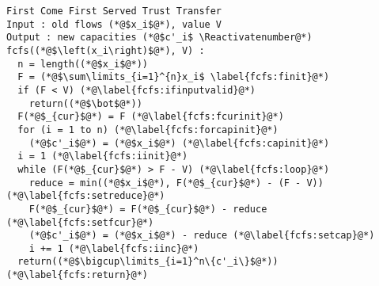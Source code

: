 \Suppressnumber
\begin{lstlisting}[label=fcfs, style=numbers]
First Come First Served Trust Transfer
Input : old flows (*@$x_i$@*), value V
Output : new capacities (*@$c'_i$ \Reactivatenumber@*)
fcfs((*@$\left(x_i\right)$@*), V) :
  n = length((*@$x_i$@*))
  F = (*@$\sum\limits_{i=1}^{n}x_i$ \label{fcfs:finit}@*)
  if (F < V) (*@\label{fcfs:ifinputvalid}@*)
    return((*@$\bot$@*))
  F(*@$_{cur}$@*) = F (*@\label{fcfs:fcurinit}@*)
  for (i = 1 to n) (*@\label{fcfs:forcapinit}@*)
    (*@$c'_i$@*) = (*@$x_i$@*) (*@\label{fcfs:capinit}@*)
  i = 1 (*@\label{fcfs:iinit}@*)
  while (F(*@$_{cur}$@*) > F - V) (*@\label{fcfs:loop}@*)
    reduce = min((*@$x_i$@*), F(*@$_{cur}$@*) - (F - V)) (*@\label{fcfs:setreduce}@*)
    F(*@$_{cur}$@*) = F(*@$_{cur}$@*) - reduce (*@\label{fcfs:setfcur}@*)
    (*@$c'_i$@*) = (*@$x_i$@*) - reduce (*@\label{fcfs:setcap}@*)
    i += 1 (*@\label{fcfs:iinc}@*)
  return((*@$\bigcup\limits_{i=1}^n\{c'_i\}$@*)) (*@\label{fcfs:return}@*)
\end{lstlisting}
